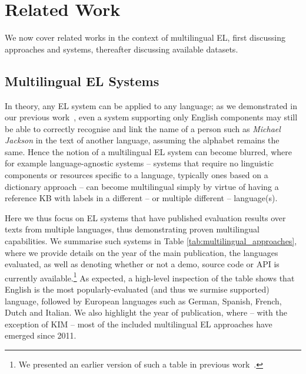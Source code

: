 \documentclass{llncs}
\begin{document}
\section{Related Work}
\label{sec:relatedWork}

We now cover related works in the context of multilingual EL, first discussing approaches and systems, thereafter discussing available datasets.

\subsection{Multilingual EL Systems}
In theory, any EL system can be applied to any language; as we demonstrated in our previous work~\cite{Rosales-MendezP17}, even a system supporting only English components may still be able to correctly recognise and link the name of a person such as \textit{Michael Jackson} in the text of another language, assuming the alphabet remains the same. Hence the notion of a multilingual EL system can become blurred, where for example language-agnostic systems -- systems that require no linguistic components or resources specific to a language, typically ones based on a dictionary approach -- can become multilingual simply by virtue of having a reference KB with labels in a different -- or multiple different -- language(s). 

Here we thus focus on EL systems that have published evaluation results over texts from multiple languages, thus demonstrating proven multilingual capabilities. We summarise such systems in Table \ref{tab:multilingual_approaches}, where we provide details on the year of the main publication, the languages evaluated, as well as denoting whether or not a demo, source code or API is currently available.\footnote{We presented an earlier version of such a table in previous work~\cite{Rosales-MendezP17}.} As expected, a high-level inspection of the table shows that English is the most popularly-evaluated (and thus we surmise supported) language, followed by European languages such as German, Spanish, French, Dutch and Italian. We also highlight the year of publication, where -- with the exception of KIM \cite{KIM-popov2004kim} -- most of the included multilingual EL approaches have emerged since 2011.
\end{document}
